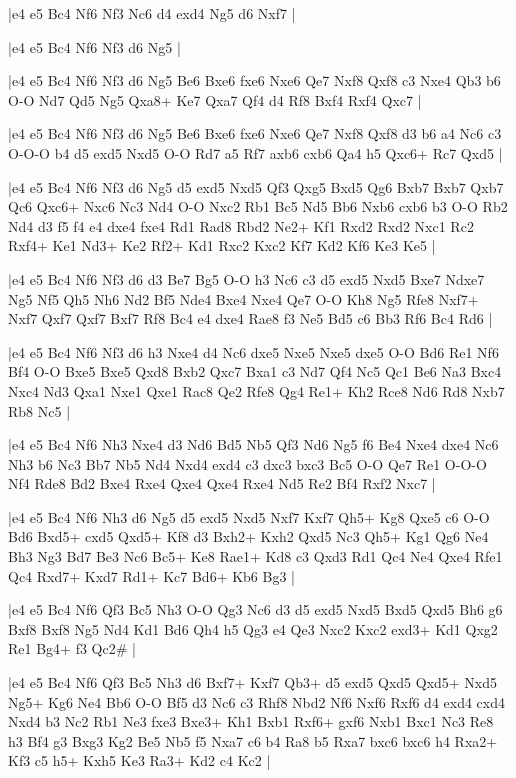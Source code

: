 \whitename{}
\blackname{}
\makegametitle
|e4 e5 Bc4 Nf6 Nf3 Nc6 d4 exd4 Ng5 d6 Nxf7  |

\whitename{}
\blackname{}
\makegametitle
|e4 e5 Bc4 Nf6 Nf3 d6 Ng5  |

\whitename{}
\blackname{}
\makegametitle
|e4 e5 Bc4 Nf6 Nf3 d6 Ng5 Be6 Bxe6 fxe6 Nxe6 Qe7 Nxf8 Qxf8 c3 Nxe4 Qb3 b6 O-O Nd7 Qd5 Ng5 Qxa8+ Ke7 Qxa7 Qf4 d4 Rf8 Bxf4 Rxf4 Qxc7  |

\whitename{}
\blackname{}
\makegametitle
|e4 e5 Bc4 Nf6 Nf3 d6 Ng5 Be6 Bxe6 fxe6 Nxe6 Qe7 Nxf8 Qxf8 d3 b6 a4 Nc6 c3 O-O-O b4 d5 exd5 Nxd5 O-O Rd7 a5 Rf7 axb6 cxb6 Qa4 h5 Qxc6+ Rc7 Qxd5  |

\whitename{}
\blackname{}
\makegametitle
|e4 e5 Bc4 Nf6 Nf3 d6 Ng5 d5 exd5 Nxd5 Qf3 Qxg5 Bxd5 Qg6 Bxb7 Bxb7 Qxb7 Qc6 Qxc6+ Nxc6 Nc3 Nd4 O-O Nxc2 Rb1 Bc5 Nd5 Bb6 Nxb6 cxb6 b3 O-O Rb2 Nd4 d3 f5 f4 e4 dxe4 fxe4 Rd1 Rad8 Rbd2 Ne2+ Kf1 Rxd2 Rxd2 Nxc1 Rc2 Rxf4+ Ke1 Nd3+ Ke2 Rf2+ Kd1 Rxc2 Kxc2 Kf7 Kd2 Kf6 Ke3 Ke5  |

\whitename{}
\blackname{}
\makegametitle
|e4 e5 Bc4 Nf6 Nf3 d6 d3 Be7 Bg5 O-O h3 Nc6 c3 d5 exd5 Nxd5 Bxe7 Ndxe7 Ng5 Nf5 Qh5 Nh6 Nd2 Bf5 Nde4 Bxe4 Nxe4 Qe7 O-O Kh8 Ng5 Rfe8 Nxf7+ Nxf7 Qxf7 Qxf7 Bxf7 Rf8 Bc4 e4 dxe4 Rae8 f3 Ne5 Bd5 c6 Bb3 Rf6 Bc4 Rd6  |

\whitename{}
\blackname{}
\makegametitle
|e4 e5 Bc4 Nf6 Nf3 d6 h3 Nxe4 d4 Nc6 dxe5 Nxe5 Nxe5 dxe5 O-O Bd6 Re1 Nf6 Bf4 O-O Bxe5 Bxe5 Qxd8 Bxb2 Qxc7 Bxa1 c3 Nd7 Qf4 Nc5 Qc1 Be6 Na3 Bxc4 Nxc4 Nd3 Qxa1 Nxe1 Qxe1 Rac8 Qe2 Rfe8 Qg4 Re1+ Kh2 Rce8 Nd6 Rd8 Nxb7 Rb8 Nc5  |

\whitename{}
\blackname{}
\makegametitle
|e4 e5 Bc4 Nf6 Nh3 Nxe4 d3 Nd6 Bd5 Nb5 Qf3 Nd6 Ng5 f6 Be4 Nxe4 dxe4 Nc6 Nh3 b6 Nc3 Bb7 Nb5 Nd4 Nxd4 exd4 c3 dxc3 bxc3 Bc5 O-O Qe7 Re1 O-O-O Nf4 Rde8 Bd2 Bxe4 Rxe4 Qxe4 Qxe4 Rxe4 Nd5 Re2 Bf4 Rxf2 Nxc7  |

\whitename{}
\blackname{}
\makegametitle
|e4 e5 Bc4 Nf6 Nh3 d6 Ng5 d5 exd5 Nxd5 Nxf7 Kxf7 Qh5+ Kg8 Qxe5 c6 O-O Bd6 Bxd5+ cxd5 Qxd5+ Kf8 d3 Bxh2+ Kxh2 Qxd5 Nc3 Qh5+ Kg1 Qg6 Ne4 Bh3 Ng3 Bd7 Be3 Nc6 Bc5+ Ke8 Rae1+ Kd8 c3 Qxd3 Rd1 Qc4 Ne4 Qxe4 Rfe1 Qc4 Rxd7+ Kxd7 Rd1+ Kc7 Bd6+ Kb6 Bg3  |

\whitename{}
\blackname{}
\makegametitle
|e4 e5 Bc4 Nf6 Qf3 Bc5 Nh3 O-O Qg3 Nc6 d3 d5 exd5 Nxd5 Bxd5 Qxd5 Bh6 g6 Bxf8 Bxf8 Ng5 Nd4 Kd1 Bd6 Qh4 h5 Qg3 e4 Qe3 Nxc2 Kxc2 exd3+ Kd1 Qxg2 Re1 Bg4+ f3 Qc2\#  |

\whitename{}
\blackname{}
\makegametitle
|e4 e5 Bc4 Nf6 Qf3 Bc5 Nh3 d6 Bxf7+ Kxf7 Qb3+ d5 exd5 Qxd5 Qxd5+ Nxd5 Ng5+ Kg6 Ne4 Bb6 O-O Bf5 d3 Nc6 c3 Rhf8 Nbd2 Nf6 Nxf6 Rxf6 d4 exd4 cxd4 Nxd4 b3 Nc2 Rb1 Ne3 fxe3 Bxe3+ Kh1 Bxb1 Rxf6+ gxf6 Nxb1 Bxc1 Nc3 Re8 h3 Bf4 g3 Bxg3 Kg2 Be5 Nb5 f5 Nxa7 c6 b4 Ra8 b5 Rxa7 bxc6 bxc6 h4 Rxa2+ Kf3 c5 h5+ Kxh5 Ke3 Ra3+ Kd2 c4 Kc2  |

